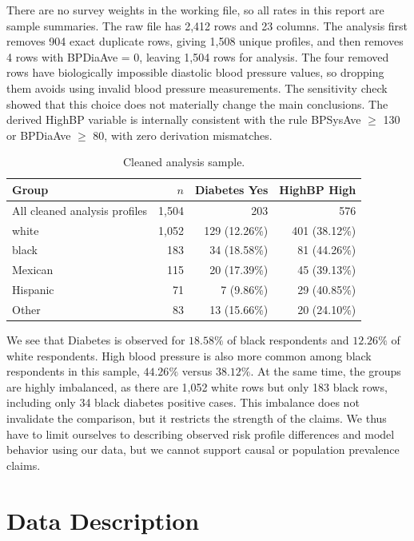 \documentclass[10pt]{article}
\begin{document}
There are no survey weights in the working file, so all rates in this report are sample summaries. The raw file has 2,412 rows and 23 columns. The analysis first removes 904 exact duplicate rows, giving 1,508 unique profiles, and then removes 4 rows with {BPDiaAve = 0}, leaving 1,504 rows for analysis.
The four removed rows have biologically impossible diastolic blood pressure values, so dropping them avoids using invalid blood pressure measurements. The sensitivity check showed that this choice does not materially change the main conclusions.
The derived {HighBP} variable is internally consistent with the rule BPSysAve $\geq$ 130 or BPDiaAve $\geq$ 80, with zero derivation mismatches.

\begin{table}[H]
\centering
\caption{Cleaned analysis sample.}
\label{tab:overview}
\small
\begin{tabular}{lrrr}
\toprule
Group & $n$ & Diabetes Yes & HighBP High \\
\midrule
All cleaned analysis profiles & 1,504 & 203 & 576 \\
white & 1,052 & 129 (12.26\%) & 401 (38.12\%) \\
black & 183 & 34 (18.58\%) & 81 (44.26\%) \\
Mexican & 115 & 20 (17.39\%) & 45 (39.13\%) \\
Hispanic & 71 & 7 (9.86\%) & 29 (40.85\%) \\
Other & 83 & 13 (15.66\%) & 20 (24.10\%) \\
\bottomrule
\end{tabular}
\end{table}

We see that Diabetes is observed for $18.58\%$ of black respondents and $12.26\%$ of white respondents. High blood pressure is also more common among black respondents in this sample, $44.26\%$ versus $38.12\%$. At the same time, the groups are highly imbalanced,
as there are 1,052 white rows but only 183 black rows, including only 34 black diabetes positive cases.
This imbalance does not invalidate the comparison, but it restricts the strength of the claims.
We thus have to limit ourselves to describing observed risk profile differences and model behavior using our data, but we cannot support causal or population prevalence claims.

\section{Data Description}
\end{document}
